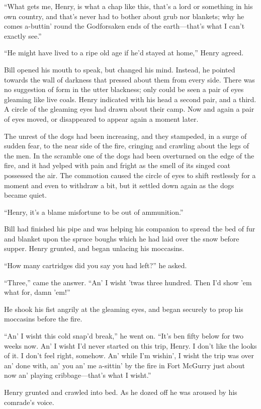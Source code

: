\documentclass[10pt]{book}
\begin{document}
“What gets me, Henry, is what a chap like this, that’s a lord or
something in his own country, and that’s never had to bother about grub
nor blankets; why he comes a-buttin’ round the Godforsaken ends of the
earth—that’s what I can’t exactly see.”

“He might have lived to a ripe old age if he’d stayed at home,” Henry
agreed.

Bill opened his mouth to speak, but changed his mind. Instead, he
pointed towards the wall of darkness that pressed about them from every
side. There was no suggestion of form in the utter blackness; only
could be seen a pair of eyes gleaming like live coals. Henry indicated
with his head a second pair, and a third. A circle of the gleaming eyes
had drawn about their camp. Now and again a pair of eyes moved, or
disappeared to appear again a moment later.

The unrest of the dogs had been increasing, and they stampeded, in a
surge of sudden fear, to the near side of the fire, cringing and
crawling about the legs of the men. In the scramble one of the dogs had
been overturned on the edge of the fire, and it had yelped with pain
and fright as the smell of its singed coat possessed the air. The
commotion caused the circle of eyes to shift restlessly for a moment
and even to withdraw a bit, but it settled down again as the dogs
became quiet.

“Henry, it’s a blame misfortune to be out of ammunition.”

Bill had finished his pipe and was helping his companion to spread the
bed of fur and blanket upon the spruce boughs which he had laid over
the snow before supper. Henry grunted, and began unlacing his
moccasins.

“How many cartridges did you say you had left?” he asked.

“Three,” came the answer. “An’ I wisht ’twas three hundred. Then I’d
show ’em what for, damn ’em!”

He shook his fist angrily at the gleaming eyes, and began securely to
prop his moccasins before the fire.

“An’ I wisht this cold snap’d break,” he went on. “It’s ben fifty below
for two weeks now. An’ I wisht I’d never started on this trip, Henry. I
don’t like the looks of it. I don’t feel right, somehow. An’ while I’m
wishin’, I wisht the trip was over an’ done with, an’ you an’ me
a-sittin’ by the fire in Fort McGurry just about now an’ playing
cribbage—that’s what I wisht.”

Henry grunted and crawled into bed. As he dozed off he was aroused by
his comrade’s voice.
\end{document}
